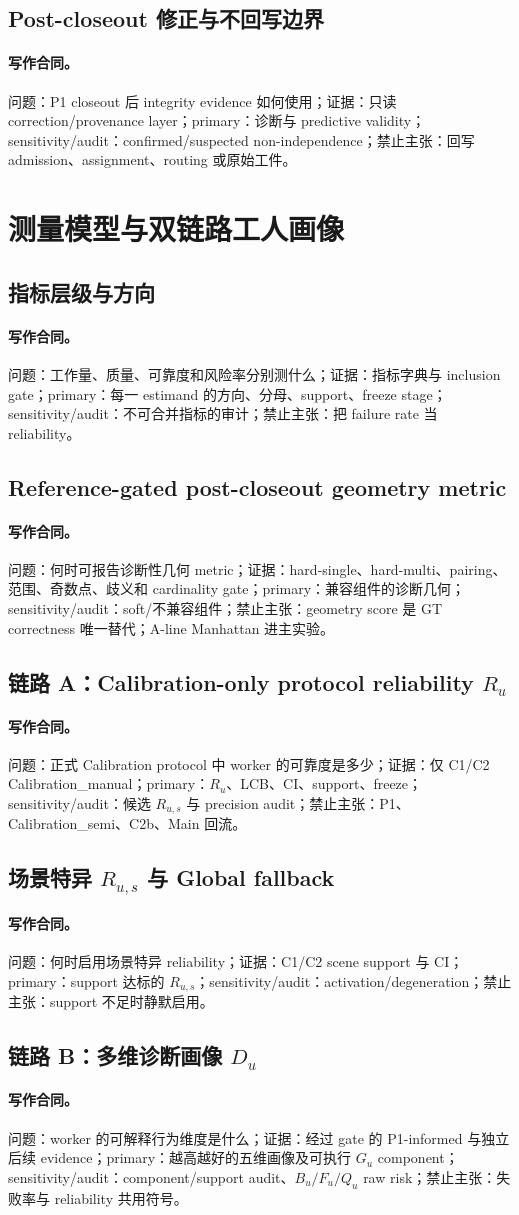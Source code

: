 \documentclass[UTF8,a4paper,12pt]{ctexart}
\newcommand{\contract}[5]{\paragraph{写作合同。}问题：#1；证据：#2；primary：#3；sensitivity/audit：#4；禁止主张：#5。}
\begin{document}
\subsection{Post-closeout 修正与不回写边界}
\contract{P1 closeout 后 integrity evidence 如何使用}{只读 correction/provenance layer}{诊断与 predictive validity}{confirmed/suspected non-independence}{回写 admission、assignment、routing 或原始工件}

\section{测量模型与双链路工人画像}
\subsection{指标层级与方向}
\contract{工作量、质量、可靠度和风险率分别测什么}{指标字典与 inclusion gate}{每一 estimand 的方向、分母、support、freeze stage}{不可合并指标的审计}{把 failure rate 当 reliability}
\subsection{Reference-gated post-closeout geometry metric}
\contract{何时可报告诊断性几何 metric}{hard-single、hard-multi、pairing、范围、奇数点、歧义和 cardinality gate}{兼容组件的诊断几何}{soft/不兼容组件}{geometry score 是 GT correctness 唯一替代；A-line Manhattan 进主实验}
\subsection{链路 A：Calibration-only protocol reliability $R_u$}
\contract{正式 Calibration protocol 中 worker 的可靠度是多少}{仅 C1/C2 Calibration\_manual}{$R_u$、LCB、CI、support、freeze}{候选 $R_{u,s}$ 与 precision audit}{P1、Calibration\_semi、C2b、Main 回流}
\subsection{场景特异 $R_{u,s}$ 与 Global fallback}
\contract{何时启用场景特异 reliability}{C1/C2 scene support 与 CI}{support 达标的 $R_{u,s}$}{activation/degeneration}{support 不足时静默启用}
\subsection{链路 B：多维诊断画像 $D_u$}
\contract{worker 的可解释行为维度是什么}{经过 gate 的 P1-informed 与独立后续 evidence}{越高越好的五维画像及可执行 $G_u$ component}{component/support audit、$B_u/F_u/Q_u$ raw risk}{失败率与 reliability 共用符号}
\end{document}
